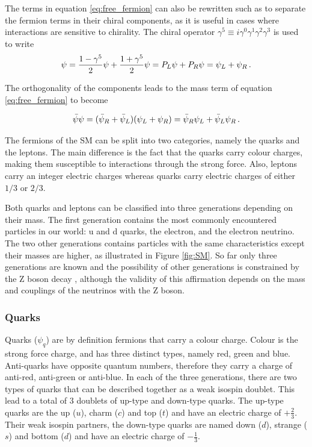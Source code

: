 The terms in equation \ref{eq:free_fermion} can also be rewritten such as to separate the fermion terms in their chiral components, as it is useful in cases where interactions are sensitive to chirality. The chiral operator $\gamma^5 \equiv i\gamma^0 \gamma^1 \gamma^2 \gamma^3$ is used to write
\begin{equation}
    \psi = \frac{1- \gamma^5}{2}\psi + \frac{1+ \gamma^5}{2}\psi = P_L \psi + P_R \psi = \psi_L + \psi_R \mend
\end{equation}

The orthogonality of the components leads to the mass term of equation \ref{eq:free_fermion} to become

\begin{equation}
    \Bar{\psi}\psi = (\Bar{\psi}_R + \Bar{\psi}_L)(\psi_L + \psi_R) = \Bar{\psi}_R \psi_L + \Bar{\psi}_L \psi_R \mend
    \label{eq:chiral_fermions}
\end{equation}

The fermions of the SM can be split into two categories, namely the quarks and the leptons. The main difference is the fact that the quarks carry colour charges, making them susceptible to interactions through the strong force. Also, leptons carry an integer electric charges whereas quarks carry electric charges of either $1/3$ or $2/3$.\newline

Both quarks and leptons can be classified into three generations depending on their mass. The first generation contains the most commonly encountered particles in our world: u and d quarks, the electron, and the electron neutrino. The two other generations contains particles with the same characteristics except their masses are higher, as illustrated in Figure \ref{fig:SM}. So far only three generations are known and the possibility of other generations is constrained by the Z boson decay \cite{2006257}, although the validity of this affirmation depends on the mass and couplings of the neutrinos with the Z boson.

\subsubsection{Quarks}

Quarks ($\psi_q$) are by definition fermions that carry a colour charge. Colour is the strong force charge, and has three distinct types, namely red, green and blue. Anti-quarks have opposite quantum numbers, therefore they carry a charge of anti-red, anti-green or anti-blue. In each of the three generations, there are two types of quarks that can be described together as a weak isospin doublet. This lead to a total of 3 doublets of up-type and down-type quarks. The up-type quarks are the up ($u$), charm ($c$) and top ($t$) and have an electric charge of $+\frac{2}{3}$. Their weak isospin partners, the down-type quarks are named down ($d$), strange ($s$) and bottom ($d$) and have an electric charge of $-\frac{1}{3}$.\newline

